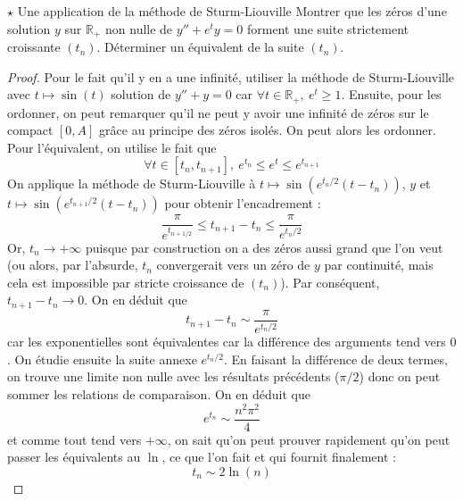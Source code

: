 \documentclass[french,a4paper]{article}
\newcommand{\R}{\mathbb{R}}
\theoremstyle{plain}
\theoremstyle{definition}
\theoremstyle{remark}
\begin{document}
\begin{ex}{$\star$ Une application de la méthode de Sturm-Liouville}
	Montrer que les zéros d'une solution $y$ sur $\R_+$ non nulle de $y''+e^ty=0$ forment une suite strictement croissante $(t_n)$. Déterminer un équivalent de la suite $(t_n)$.
\end{ex}
\begin{proof}
	Pour le fait qu'il y en a une infinité, utiliser la méthode de Sturm-Liouville avec $t\mapsto \sin(t)$ solution de $y''+y=0$ car $\forall t\in\R_+,\ e^t\geqslant 1$. Ensuite, pour les ordonner, on peut remarquer qu'il ne peut y avoir une infinité de zéros sur le compact $[0,A]$ grâce au principe des zéros isolés. On peut alors les ordonner. Pour l'équivalent, on utilise le fait que $$\forall t\in[t_n,t_{n+1}],\ e^{t_n}\leqslant e^t\leqslant e^{t_{n+1}}$$ On applique la méthode de Sturm-Liouville à $t\mapsto \sin(e^{t_n/2}(t-t_n))$, $y$ et $t\mapsto\sin(e^{t_{n+1}/2}(t-t_n))$ pour obtenir l'encadrement : $$\frac{\pi}{e^{t_{n+1/2}}}\leqslant t_{n+1}-t_n\leqslant\frac{\pi}{e^{t_n/2}}$$ Or, $t_n\to+\infty$ puisque par construction on a des zéros aussi grand que l'on veut (ou alors, par l'absurde, $t_n$ convergerait vers un zéro de $y$ par continuité, mais cela est impossible par stricte croissance de $(t_n)$). Par conséquent, $t_{n+1}-t_n\to 0$. On en déduit que $$t_{n+1}-t_n\sim \frac{\pi}{e^{t_n/2}}$$ car les exponentielles sont équivalentes car la différence des arguments tend vers $0$. On étudie ensuite la suite annexe $e^{t_n/2}$. En faisant la différence de deux termes, on trouve une limite non nulle avec les résultats précédents ($\pi/2$) donc on peut sommer les relations de comparaison. On en déduit que $$e^{t_n}\sim \frac{n^2\pi^2}{4}$$ et comme tout tend vers $+\infty$, on sait qu'on peut prouver rapidement qu'on peut passer les équivalents au $\ln$, ce que l'on fait et qui fournit finalement : $$t_n\sim 2\ln(n)$$
\end{proof}
\end{document}
